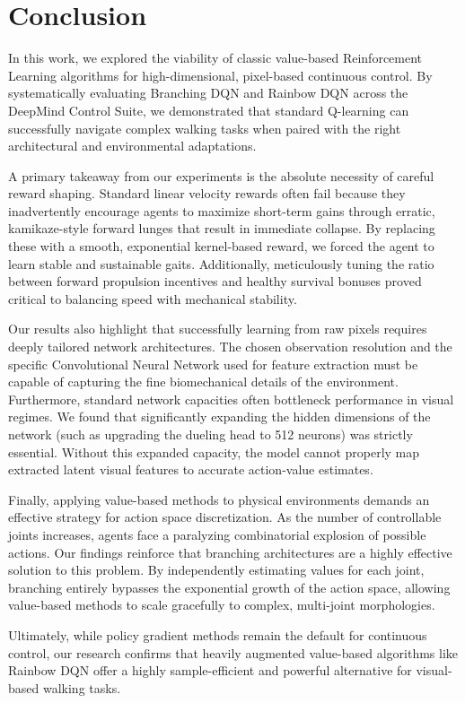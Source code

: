 \section{Conclusion}
\label{sec:conclusion}

In this work, we explored the viability of classic value-based Reinforcement Learning algorithms for high-dimensional, pixel-based continuous control. By systematically evaluating Branching DQN and Rainbow DQN across the DeepMind Control Suite, we demonstrated that standard Q-learning can successfully navigate complex walking tasks when paired with the right architectural and environmental adaptations.

A primary takeaway from our experiments is the absolute necessity of careful reward shaping. Standard linear velocity rewards often fail because they inadvertently encourage agents to maximize short-term gains through erratic, kamikaze-style forward lunges that result in immediate collapse. By replacing these with a smooth, exponential kernel-based reward, we forced the agent to learn stable and sustainable gaits. Additionally, meticulously tuning the ratio between forward propulsion incentives and healthy survival bonuses proved critical to balancing speed with mechanical stability.

Our results also highlight that successfully learning from raw pixels requires deeply tailored network architectures. The chosen observation resolution and the specific Convolutional Neural Network used for feature extraction must be capable of capturing the fine biomechanical details of the environment. Furthermore, standard network capacities often bottleneck performance in visual regimes. We found that significantly expanding the hidden dimensions of the network (such as upgrading the dueling head to 512 neurons) was strictly essential. Without this expanded capacity, the model cannot properly map extracted latent visual features to accurate action-value estimates.

Finally, applying value-based methods to physical environments demands an effective strategy for action space discretization. As the number of controllable joints increases, agents face a paralyzing combinatorial explosion of possible actions. Our findings reinforce that branching architectures are a highly effective solution to this problem. By independently estimating values for each joint, branching entirely bypasses the exponential growth of the action space, allowing value-based methods to scale gracefully to complex, multi-joint morphologies.

Ultimately, while policy gradient methods remain the default for continuous control, our research confirms that heavily augmented value-based algorithms like Rainbow DQN offer a highly sample-efficient and powerful alternative for visual-based walking tasks.